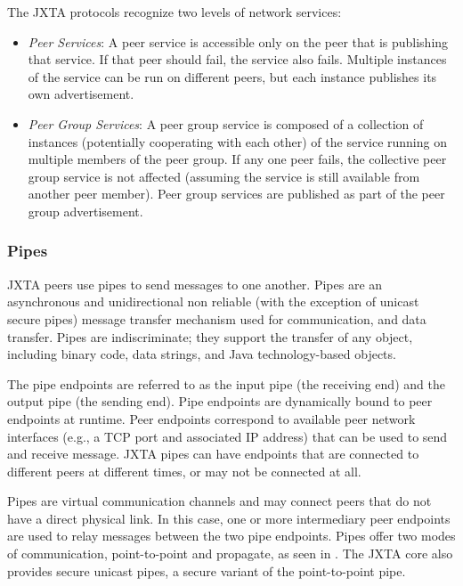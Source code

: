 The JXTA protocols recognize two levels of network services:
\begin{itemize}
 \item \emph{Peer Services}: A peer service is accessible only on the peer that is publishing that service. If that peer should fail, the service also fails. Multiple instances of the service can be run on different peers, but each instance publishes its own advertisement. 
 \item \emph{Peer Group Services}: A peer group service is composed of a collection of instances (potentially cooperating with each other) of the service running on multiple members of the peer group. If any one peer fails, the collective peer group service is not affected (assuming the service is still available from another peer member). Peer group services are published as part of the peer group advertisement. 
\end{itemize}

\subsubsection{Pipes}
JXTA peers use pipes to send messages to one another. Pipes are an asynchronous and unidirectional non reliable (with the exception of unicast secure pipes) message transfer mechanism used for communication, and data transfer. Pipes are indiscriminate; they support the transfer of any object, including binary code, data strings, and Java technology-based objects. 

The pipe endpoints are referred to as the input pipe (the receiving end) and the output pipe (the sending end). Pipe endpoints are dynamically bound to peer endpoints at runtime. Peer endpoints correspond to available peer network interfaces (e.g., a TCP port and associated IP address) that can be used to send and receive message. JXTA pipes can have endpoints that are connected to different peers at different times, or may not be connected at all. 

Pipes are virtual communication channels and may connect peers that do not have a direct physical link. In this 
case, one or more intermediary peer endpoints are used to relay messages between the two pipe endpoints. 
Pipes offer two modes of communication, point-to-point and propagate, as seen in . The JXTA core also provides 
secure unicast pipes, a secure variant of the point-to-point pipe. 

